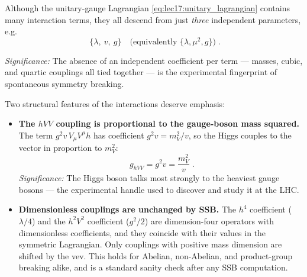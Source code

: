 Although the unitary-gauge Lagrangian \eqref{eq:lec17:unitary_lagrangian} contains many interaction terms, they all descend from just \emph{three} independent parameters, e.g.
\begin{equation}
  \boxed{\;\{\lambda,\ v,\ g\}\quad\text{(equivalently }\{\lambda,\mu^2,g\}\text{)}\;.}
  \label{eq:lec17:three_params}
\end{equation}

\textit{Significance:} The absence of an independent coefficient per term --- masses, cubic, and quartic couplings all tied together --- is the experimental fingerprint of spontaneous symmetry breaking.

Two structural features of the interactions deserve emphasis:
\begin{itemize}
  \item \textbf{The $hVV$ coupling is proportional to the gauge-boson mass squared.} The term $g^2v\,V_\mu V^\mu h$ has coefficient $g^2v=m_V^2/v$, so the Higgs couples to the vector in proportion to $m_V^2$:
  \begin{equation}
    \boxed{\;g_{hVV}=g^2v=\frac{m_V^2}{v}\;.}
    \label{eq:lec17:hVV_coupling}
  \end{equation}
  \textit{Significance:} The Higgs boson talks most strongly to the heaviest gauge bosons --- the experimental handle used to discover and study it at the LHC.
  \item \textbf{Dimensionless couplings are unchanged by SSB.} The $h^4$ coefficient ($\lambda/4$) and the $h^2V^2$ coefficient ($g^2/2$) are dimension-four operators with dimensionless coefficients, and they coincide with their values in the symmetric Lagrangian. Only couplings with positive mass dimension are shifted by the vev. This holds for Abelian, non-Abelian, and product-group breaking alike, and is a standard sanity check after any SSB computation.
\end{itemize}

